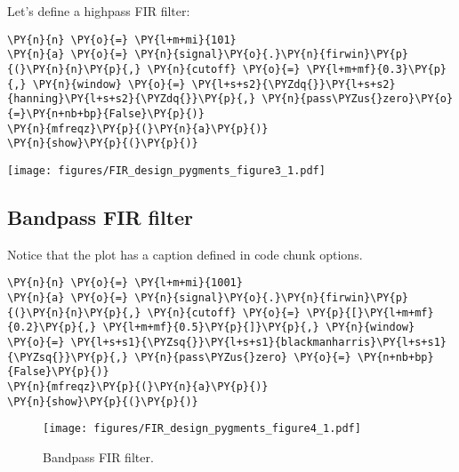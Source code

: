 \documentclass[a4paper,11pt,final]{article}
\begin{document}
Let's define a highpass FIR filter:



\begin{Verbatim}[commandchars=\\\{\},frame=single,fontsize=\small, xleftmargin=0.5em]
\PY{n}{n} \PY{o}{=} \PY{l+m+mi}{101}
\PY{n}{a} \PY{o}{=} \PY{n}{signal}\PY{o}{.}\PY{n}{firwin}\PY{p}{(}\PY{n}{n}\PY{p}{,} \PY{n}{cutoff} \PY{o}{=} \PY{l+m+mf}{0.3}\PY{p}{,} \PY{n}{window} \PY{o}{=} \PY{l+s+s2}{\PYZdq{}}\PY{l+s+s2}{hanning}\PY{l+s+s2}{\PYZdq{}}\PY{p}{,} \PY{n}{pass\PYZus{}zero}\PY{o}{=}\PY{n+nb+bp}{False}\PY{p}{)}
\PY{n}{mfreqz}\PY{p}{(}\PY{n}{a}\PY{p}{)}
\PY{n}{show}\PY{p}{(}\PY{p}{)}
\end{Verbatim}
\texttt{[image: figures/FIR\_design\_pygments\_figure3\_1.pdf]}


\subsection{Bandpass FIR filter}

Notice that the plot has a caption defined in code chunk options.




\begin{Verbatim}[commandchars=\\\{\},frame=single,fontsize=\small, xleftmargin=0.5em]
\PY{n}{n} \PY{o}{=} \PY{l+m+mi}{1001}
\PY{n}{a} \PY{o}{=} \PY{n}{signal}\PY{o}{.}\PY{n}{firwin}\PY{p}{(}\PY{n}{n}\PY{p}{,} \PY{n}{cutoff} \PY{o}{=} \PY{p}{[}\PY{l+m+mf}{0.2}\PY{p}{,} \PY{l+m+mf}{0.5}\PY{p}{]}\PY{p}{,} \PY{n}{window} \PY{o}{=} \PY{l+s+s1}{\PYZsq{}}\PY{l+s+s1}{blackmanharris}\PY{l+s+s1}{\PYZsq{}}\PY{p}{,} \PY{n}{pass\PYZus{}zero} \PY{o}{=} \PY{n+nb+bp}{False}\PY{p}{)}
\PY{n}{mfreqz}\PY{p}{(}\PY{n}{a}\PY{p}{)}
\PY{n}{show}\PY{p}{(}\PY{p}{)}
\end{Verbatim}
\begin{figure}[htpb]
\center
\texttt{[image: figures/FIR\_design\_pygments\_figure4\_1.pdf]}
\caption{Bandpass FIR filter.}
\label{fig:None}
\end{figure}
\end{document}
